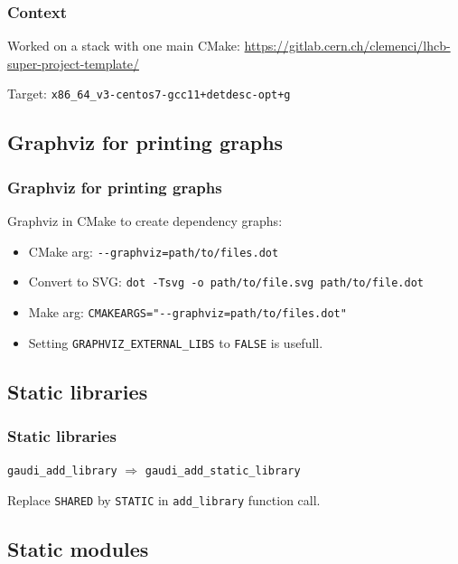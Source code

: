 \documentclass{beamer}
\begin{document}
    \begin{frame}[fragile]
        \frametitle{Context}

        Worked on a stack with one main CMake:
        \scriptsize \url{https://gitlab.cern.ch/clemenci/lhcb-super-project-template/} \normalsize

        Target: \verb'x86_64_v3-centos7-gcc11+detdesc-opt+g'
    \end{frame}

    \subsection{Graphviz for printing graphs}

    \begin{frame}[fragile]
        \frametitle{Graphviz for printing graphs}

        Graphviz in CMake to create dependency graphs:
        \begin{itemize}
            \item CMake arg: \verb'--graphviz=path/to/files.dot'
            \item Convert to SVG: \verb'dot -Tsvg -o path/to/file.svg path/to/file.dot'
            \item Make arg: \verb'CMAKEARGS="--graphviz=path/to/files.dot"'
            \item Setting \verb'GRAPHVIZ_EXTERNAL_LIBS' to \verb'FALSE' is usefull.
        \end{itemize}

    \end{frame}

    \subsection{Static libraries}

    \begin{frame}[fragile]
        \frametitle{Static libraries}

        \verb'gaudi_add_library' $\Rightarrow$ \verb'gaudi_add_static_library'

        Replace \verb'SHARED' by \verb'STATIC' in \verb'add_library' function call.
    \end{frame}

    \subsection{Static modules}
\end{document}
